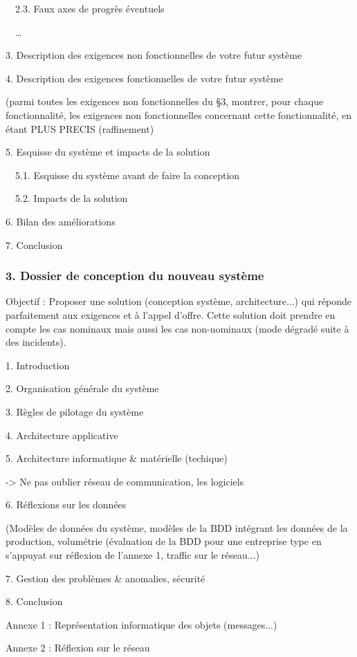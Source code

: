 \documentclass{article}
\begin{document}
\ \ 2.3. Faux axes de progrès éventuels

\ \ …

3. Description des exigences non fonctionnelles de votre futur système

4. Description des exigences fonctionnelles de votre futur système

(parmi toutes les exigences non fonctionnelles du §3, montrer, pour
chaque fonctionnalité, les exigences non fonctionnelles concernant
cette fonctionnalité, en étant PLUS PRECIS (raffinement)

5. Esquisse du système et impacts de la solution

\ \ 5.1. Esquisse du système avant de faire la conception

\ \ 5.2. Impacts de la solution

6. Bilan des améliorations

7. Conclusion

\subsubsection[3. Dossier de conception du nouveau système]{3. Dossier
de conception du nouveau système}
Objectif : Proposer une solution (conception système, architecture...)
qui réponde parfaitement aux exigences et à l’appel d’offre. Cette
solution doit prendre en compte les cas nominaux mais aussi les cas
non-nominaux (mode dégradé suite à des incidents).

1. Introduction

2. Organisation générale du système

3. Règles de pilotage du système

4. Architecture applicative

5. Architecture informatique \& matérielle (techique)

{}-{\textgreater} Ne pas oublier réseau de communication, les logiciels

6. Réflexions sur les données

(Modèles de données du système, modèles de la BDD intégrant les données
de la production, volumétrie (évaluation de la BDD pour une entreprise
type en s’appuyat sur réflexion de l’annexe 1, traffic sur le
réseau...)

7. Gestion des problèmes \& anomalies, sécurité

8. Conclusion

Annexe 1 : Représentation informatique des objets (messages...)

Annexe 2 : Réflexion sur le réseau
\end{document}
